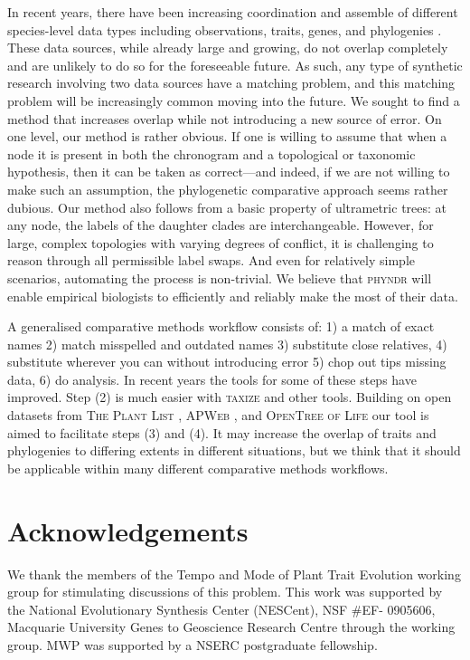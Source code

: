 \documentclass[a4paper,11pt]{article}
\begin{document}
In recent years, there have been increasing coordination and assemble of different species-level data types including observations, traits, genes, and phylogenies \citep{Parr2012}.  These data sources, while already large and growing, do not overlap completely and are unlikely to do so for the foreseeable future.  As such, any type of synthetic research involving two data sources have a matching problem, and this matching problem will be increasingly common moving into the future.  We sought to find a method that increases overlap while not introducing a new source of error.  On one level, our method is rather obvious. If one is willing to assume that when a node it is present in both the chronogram and a topological or taxonomic hypothesis, then it can be taken as correct---and indeed, if we are not willing to make such an assumption, the phylogenetic comparative approach seems rather dubious.  Our method also follows from a basic property of ultrametric trees: at any node, the labels of the daughter clades are interchangeable. However, for large, complex topologies with varying degrees of conflict, it is challenging to reason through all permissible label swaps. And even for relatively simple scenarios, automating the process is non-trivial. We believe that \textsc{phyndr} will enable empirical biologists to efficiently and reliably make the most of their data.

A generalised comparative methods workflow consists of:  1) a match of exact names 2) match misspelled and outdated names 3) substitute close relatives, 4) substitute wherever you can without introducing error 5) chop out tips missing data, 6) do analysis.  In recent years the tools for some of these steps have improved.  Step (2) is much easier with \textsc{taxize} \citep{taxize} and other tools.  Building on open datasets from \textsc{The Plant List} \citep{ThePlantList}, \textsc{APWeb} \citep{apweb}, and \textsc{OpenTree of Life} \citet{OpenTree} our tool is aimed to facilitate steps (3) and (4).  It may increase the overlap of traits and phylogenies to differing extents in different situations, but we think that it should be applicable within many different comparative methods workflows.

\section{Acknowledgements}
We thank the members of the Tempo and Mode of Plant Trait
Evolution working group for stimulating discussions of this problem. This work was supported by the National Evolutionary Synthesis Center
(NESCent), NSF \#EF- 0905606, Macquarie University Genes to Geoscience
Research Centre through the working group. MWP was supported by a NSERC postgraduate fellowship.


\clearpage



\end{document}
